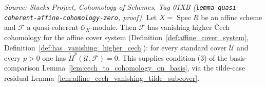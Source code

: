 \begin{lemma}
  \label{lem:affine_cech_vanishing_qcoh}
  \textit{Source: Stacks Project, Cohomology of Schemes, Tag 01XB
  (\texttt{lemma-quasi-coherent-affine-cohomology-zero}, proof).}
  Let \(X = \operatorname{Spec} R\) be an affine scheme and \(\mathcal{F}\) a quasi-coherent
  \(\mathcal{O}_X\)-module. Then \(\mathcal{F}\) has vanishing higher {\v C}ech cohomology for the
  affine cover system (Definition~\ref{def:affine_cover_system},
  Definition~\ref{def:has_vanishing_higher_cech}): for every standard cover \(\mathcal{U}\) and every
  \(p > 0\) one has \(\check{H}^p(\mathcal{U}, \mathcal{F}) = 0\). This supplies condition (3) of the
  basis-comparison Lemma~\ref{lem:cech_to_cohomology_on_basis}, via the tilde-case residual
  Lemma~\ref{lem:affine_cech_vanishing_tilde_subcover}.
\end{lemma}

